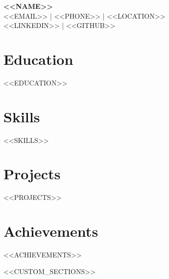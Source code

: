 \documentclass[11pt,a4paper]{article}
\begin{document}
\begin{center}
{\LARGE\bfseries <<NAME>>}\\[0.2cm]
<<EMAIL>> | <<PHONE>> | <<LOCATION>>\\[0.1cm]
<<LINKEDIN>> | <<GITHUB>>
\end{center}

\vspace{0.4cm}

\section{Education}
<<EDUCATION>>

\section{Skills}
<<SKILLS>>

\section{Projects}
<<PROJECTS>>

\section{Achievements}
\begin{itemize}[leftmargin=*]
<<ACHIEVEMENTS>>
\end{itemize}

<<CUSTOM_SECTIONS>>
\end{document}
